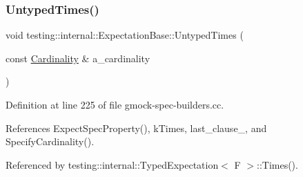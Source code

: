 \subsubsection{\texorpdfstring{Untyped\+Times()}{UntypedTimes()}}
{\footnotesize\ttfamily void testing\+::internal\+::\+Expectation\+Base\+::\+Untyped\+Times (\begin{DoxyParamCaption}\item[{const \hyperlink{classtesting_1_1Cardinality}{Cardinality} \&}]{a\+\_\+cardinality }\end{DoxyParamCaption})\hspace{0.3cm}{\ttfamily [protected]}}



Definition at line 225 of file gmock-\/spec-\/builders.\+cc.



References Expect\+Spec\+Property(), k\+Times, last\+\_\+clause\+\_\+, and Specify\+Cardinality().



Referenced by testing\+::internal\+::\+Typed\+Expectation$<$ F $>$\+::\+Times().


